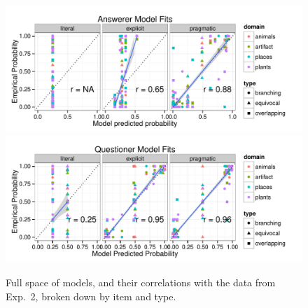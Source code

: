 \documentclass[12pt, floatsintext, jou]{apa6}
\begin{document}
%
\begin{figure}[t!]
\begin{center}
\includegraphics[scale=1]{Exp2UnifPriorAnsFits}
\includegraphics[scale=1]{Exp2UnifPriorQuestFits}
\end{center}
\caption{Full space of models, and their correlations with the data from Exp.~2, broken down by item and type.}
\label{fig:Exp2ModelSpace}
\end{figure}
%
\end{document}
